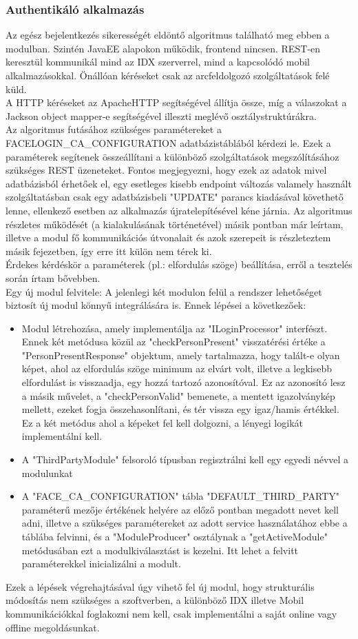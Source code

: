 \subsubsection{Authentikáló alkalmazás}
Az egész bejelentkezés sikerességét eldöntő algoritmus található meg ebben a modulban. Szintén JavaEE alapokon működik, frontend nincsen. REST-en keresztül kommunikál mind az IDX szerverrel, mind a kapcsolódó mobil alkalmazásokkal. Önállóan kéréseket csak az arcfeldolgozó szolgáltatások felé küld.
\\A HTTP kéréseket az ApacheHTTP segítségével állítja össze, míg a válaszokat a Jackson object mapper-e segítségével illeszti meglévő osztálystruktúrákra.
\\ Az algoritmus futásához szükséges paramétereket a FACELOGIN\_CA\_CONFIGURATION adatbázistáblából kérdezi le. Ezek a paraméterek segítenek összeállítani a különböző szolgáltatások megszólításához szükséges REST üzeneteket. Fontos megjegyezni, hogy ezek az adatok mivel adatbázisból érhetőek el, egy esetleges kisebb endpoint változás valamely használt szolgáltatásban csak egy adatbázisbeli "UPDATE" parancs kiadásával követhető lenne, ellenkező esetben az alkalmazás újratelepítésével kéne járnia. Az algoritmus részletes működését (a kialakulásának történetével) másik pontban már leírtam, illetve a modul fő kommunikációs útvonalait és azok szerepeit is részleteztem másik fejezetben, így erre itt külön nem térek ki.
\\Érdekes kérdéskör a paraméterek (pl.: elfordulás szöge) beállítása, erről a tesztelés során írtam bővebben.
\\Egy új modul felvitele:
A jelenlegi két modulon felül a rendszer lehetőséget biztosít új modul könnyű integrálására is. Ennek lépései a következőek:
\begin{itemize}
\item Modul létrehozása, amely implementálja az "ILoginProcessor" interfészt. Ennek két metódusa közül az "checkPersonPresent" visszatérési értéke a "PersonPresentResponse" objektum, amely tartalmazza, hogy talált-e olyan képet, ahol az elfordulás szöge minimum az elvárt volt, illetve a legkisebb elfordulást is visszaadja, egy hozzá tartozó azonosítóval. Ez az azonosító lesz a másik művelet, a "checkPersonValid" bemenete, a mentett igazolványkép mellett, ezeket fogja összehasonlítani, és tér vissza egy igaz/hamis értékkel. Ez a két metódus ahol a képeket fel kell dolgozni, a lényegi logikát implementálni kell.
\item  A "ThirdPartyModule" felsoroló típusban regisztrálni kell egy egyedi névvel a modulunkat
\item A "FACE\_CA\_CONFIGURATION" tábla "DEFAULT\_THIRD\_PARTY" paraméterű mezője értékének helyére az előző pontban megadott nevet kell adni, illetve a szükséges paramétereket az adott service használatához ebbe a táblába felvinni, és a "ModuleProducer" osztálynak a "getActiveModule" metódusában ezt a modulkiválasztást is kezelni. Itt lehet a felvitt paraméterekkel inicializálni a modult.
\end{itemize}

Ezek a lépések végrehajtásával úgy vihető fel új modul, hogy strukturális módosítás nem szükséges a szoftverben, a különböző IDX illetve Mobil kommunikációkkal foglakozni nem kell, csak implementálni a saját online vagy offline megoldásunkat.